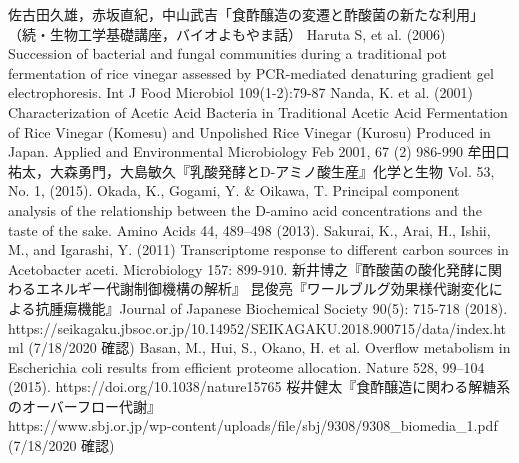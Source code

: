 \documentclass[uplatex, dvipdfmx]{jsarticle}
\begin{document}
\begin{thebibliography}{9}
        佐古田久雄，赤坂直紀，中山武吉「食酢醸造の変遷と酢酸菌の新たな利用」
        （続・生物工学基礎講座，バイオよもやま話）
        Haruta S, et al. (2006) Succession of bacterial and fungal communities during a traditional pot fermentation of rice vinegar assessed by PCR-mediated denaturing gradient gel electrophoresis. Int J Food Microbiol 109(1-2):79-87
        Nanda, K. et al. (2001) Characterization of Acetic Acid Bacteria in Traditional Acetic Acid Fermentation of Rice Vinegar (Komesu) and Unpolished Rice Vinegar (Kurosu) Produced in Japan. Applied and Environmental Microbiology Feb 2001, 67 (2) 986-990
        牟田口祐太，大森勇門，大島敏久『乳酸発酵とD-アミノ酸生産』化学と生物 Vol. 53, No. 1, (2015).
        Okada, K., Gogami, Y. \& Oikawa, T. Principal component analysis of the relationship between the D-amino acid concentrations and the taste of the sake. Amino Acids 44, 489–498 (2013). 
        Sakurai, K., Arai, H., Ishii, M., and Igarashi, Y. (2011) Transcriptome response to different carbon sources in Acetobacter aceti. Microbiology 157: 899-910.
        新井博之『酢酸菌の酸化発酵に関わるエネルギー代謝制御機構の解析』
        昆俊亮『ワールブルグ効果様代謝変化による抗腫瘍機能』Journal of Japanese Biochemical Society 90(5): 715-718 (2018).
        https://seikagaku.jbsoc.or.jp/10.14952/SEIKAGAKU.2018.900715/data/index.html (7/18/2020 確認)
        Basan, M., Hui, S., Okano, H. et al. Overflow metabolism in Escherichia coli results from efficient proteome allocation. Nature 528, 99–104 (2015). https://doi.org/10.1038/nature15765
        桜井健太『食酢醸造に関わる解糖系のオーバーフロー代謝』\\
        \textrm{https://www.sbj.or.jp/wp-content/uploads/file/sbj/9308/9308\_biomedia\_1.pdf} (7/18/2020 確認)
\end{thebibliography}
\end{document}
